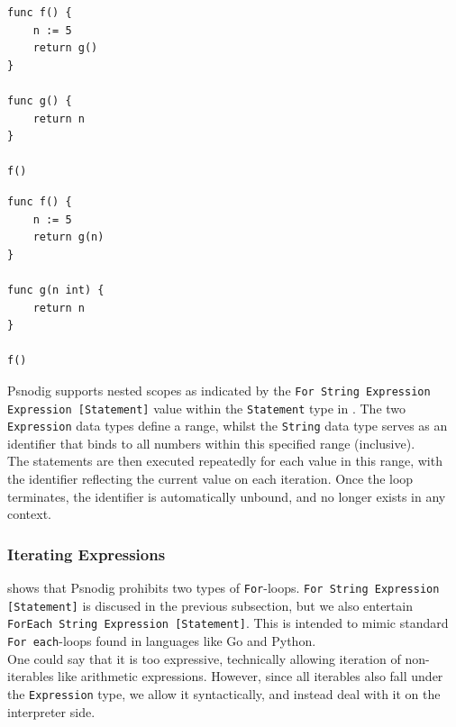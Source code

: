\begin{minipage}{.45\textwidth}
\begin{lstlisting}[caption={Gourmet program that provokes a runtime error.}, captionpos=b, label={Gourmet program that provokes a runtime error.}]
func f() {
    n := 5
    return g()
}

func g() {
    return n
}

f()
\end{lstlisting}
\end{minipage}\hfill
\begin{minipage}{.45\textwidth}
\begin{lstlisting}[caption={Gourmet program that will run uninterrupted.}, captionpos=b, label={Gourmet code without error.}]
func f() {
    n := 5
    return g(n)
}

func g(n int) {
    return n
}

f()
\end{lstlisting}
\end{minipage}

Psnodig supports nested scopes as indicated by the \texttt{For String Expression Expression [Statement]} value within the \texttt{Statement} type in . The two \texttt{Expression} data types define a range, whilst the \texttt{String} data type serves as an identifier that binds to all numbers within this specified range (inclusive). \\

The statements are then executed repeatedly for each value in this range, with the identifier reflecting the current value on each iteration. Once the loop terminates, the identifier is automatically unbound, and no longer exists in any context.

\subsubsection{Iterating Expressions}

 shows that Psnodig prohibits two types of \texttt{For}-loops. \texttt{For String Expression [Statement]} is discused in the previous subsection, but we also entertain \texttt{ForEach String Expression [Statement]}. This is intended to mimic standard \texttt{For each}-loops found in languages like Go and Python. \\

One could say that it is too expressive, technically allowing iteration of non-iterables like arithmetic expressions. However, since all iterables also fall under the \texttt{Expression} type, we allow it syntactically, and instead deal with it on the interpreter side.

